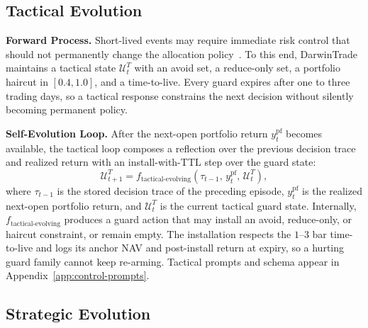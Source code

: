 \documentclass[letterpaper]{article}
\begin{document}
\subsection{Tactical Evolution}
\label{sec:tactical-evolution}

\textbf{Forward Process.}\quad
Short-lived events may require immediate risk control that should not
permanently change the allocation
policy~\citep{liu2025finpos,liu2025finrs}. To this end, DarwinTrade
maintains a tactical state $\mathcal{U}^T_t$ with an avoid set, a
reduce-only set, a portfolio haircut in $[0.4,1.0]$, and a time-to-live.
Every guard expires after one to three trading days, so a tactical
response constrains the next decision without silently becoming
permanent policy.

\textbf{Self-Evolution Loop.}\quad
After the next-open portfolio return $y^{\mathrm{pf}}_t$ becomes
available, the tactical loop composes a reflection over the previous
decision trace and realized return with an install-with-TTL step over
the guard state:
\begin{equation}
\mathcal{U}^T_{t+1}
  = f_{\text{tactical-evolving}}(\tau_{t-1},\, y^{\mathrm{pf}}_t,\,
    \mathcal{U}^T_t),
\label{eq:tactical-evolving}
\end{equation}
where $\tau_{t-1}$ is the stored decision trace of the preceding
episode, $y^{\mathrm{pf}}_t$ is the realized next-open portfolio
return, and $\mathcal{U}^T_t$ is the current tactical guard state.
Internally, $f_{\text{tactical-evolving}}$ produces a guard action that
may install an avoid, reduce-only, or haircut constraint, or remain
empty. The installation respects the $1$--$3$ bar time-to-live and
logs its anchor NAV and post-install return at expiry, so a hurting
guard family cannot keep re-arming. Tactical prompts and schema appear
in Appendix~\ref{app:control-prompts}.

\subsection{Strategic Evolution}
\label{sec:strategic-evolution}
\end{document}
